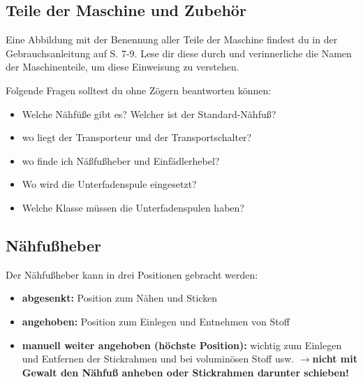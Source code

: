 \documentclass{\basedir/fablab-document}
\newcommand{\pfeil}{\ensuremath{\rightarrow}}
\begin{document}
\subsection{Teile der Maschine und Zubehör}

Eine Abbildung mit der Benennung aller Teile der Maschine findest du in der Gebrauchsanleitung auf S. 7-9. Lese dir diese durch und verinnerliche die Namen der Maschinenteile, um diese Einweisung zu verstehen.

\vspace{2em}

Folgende Fragen solltest du ohne Zögern beantworten können:
\begin{itemize}
 \item Welche Nähfüße gibt es? Welcher ist der Standard-Nähfuß?
 \item wo liegt der Transporteur und der Transportschalter?
 \item wo finde ich Näßfußheber und Einfädlerhebel?
 \item Wo wird die Unterfadenspule eingesetzt?
 \item Welche Klasse müssen die Unterfadenspulen haben?
\end{itemize}


\subsection{Nähfußheber}
Der Nähfußheber kann in drei Positionen gebracht werden:
\begin{itemize}
 \item \textbf{abgesenkt:} Position zum Nähen und Sticken
 \item \textbf{angehoben:} Position zum Einlegen und Entnehmen von Stoff 
 \item \textbf{manuell weiter angehoben (höchste Position):} wichtig zum Einlegen und Entfernen der Stickrahmen und bei voluminösen Stoff usw. \pfeil \textbf{nicht mit Gewalt den Nähfuß anheben oder Stickrahmen darunter schieben!}
\end{itemize}
\end{document}

